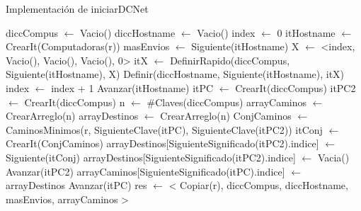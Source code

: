 \begin{Algoritmos}
\begin{algorithm}
\caption{Implementaci\'on de iniciarDCNet}
\begin{algorithmic}[0]
	\State diccCompus $\gets$ Vacio()  
	\State diccHostname $\gets$ Vacio()  
	\State index $\gets$  0 
	\State itHostname $\gets$  CrearIt(Computadoras(r)) 
	\State masEnvios $\gets$ Siguiente(itHostname) 
	 
		\State X $\gets$ <index, Vacio(), Vacio(), Vacio(), 0> 
		\State itX $\gets$ DefinirRapido(diccCompus, Siguiente(itHostname), X)   
		\State Definir(diccHostname, Siguiente(itHostname), itX)   
		\State index $\gets$ index + 1 
		\State Avanzar(itHostname) 
	\EndWhile
	\State itPC $\gets$ CrearIt(diccCompus) 
	\State itPC2 $\gets$ CrearIt(diccCompus) 				 	 	
	\State n $\gets$ \#Claves(diccCompus) 
	\State arrayCaminos $\gets$ CrearArreglo(n) 
	 
		\State arrayDestinos $\gets$ CrearArreglo(n) 
		 
			\State ConjCaminos $\gets$ CaminosMinimos(r, SiguienteClave(itPC), SiguienteClave(itPC2)) 
			\State itConj $\gets$ CrearIt(ConjCaminos) 
			   
				\State arrayDestinos[SiguienteSignificado(itPC2).indice] $\gets$ Siguiente(itConj) 
			\Else 
				\State arrayDestinos[SiguienteSignificado(itPC2).indice] $\gets$ Vacia() 
			\EndIf
			\State Avanzar(itPC2) 
		\EndWhile
		\State arrayCaminos[SiguienteSignificado(itPC).indice] $\gets$ arrayDestinos 
		\State Avanzar(itPC) 
	\EndWhile	
	\State res $\gets$ < Copiar(r), diccCompus, diccHostname, masEnvios, arrayCaminos > 


\end{algorithmic}
\end{algorithm}
\end{Algoritmos}
